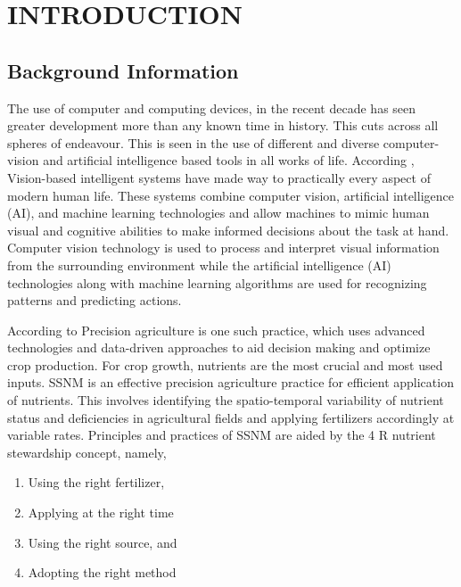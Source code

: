 \chapter{INTRODUCTION}
\section{Background Information}
The use of computer and computing devices, in the recent decade has seen greater development more than any known time in history. This cuts across all spheres of endeavour. This is seen in the use of different and diverse computer-vision and artificial intelligence based tools in all works of life. According
\citep{ghazalComputerVisionSmart2024}, Vision-based intelligent systems have made way to practically every aspect of modern human life. These systems combine computer vision, artificial intelligence (AI), and machine learning technologies and allow machines to mimic human visual and cognitive abilities to make informed decisions about the task at hand. Computer vision technology is used to process and interpret visual information from the surrounding environment while the artificial intelligence (AI) technologies along with machine learning algorithms are used for recognizing patterns and predicting actions.

According to \citep{VULLAGANTI2025147} Precision agriculture is one such practice, which uses advanced technologies and data-driven approaches to aid decision making and optimize crop production. For crop growth, nutrients are the most crucial and most used inputs. SSNM is an effective precision agriculture practice for efficient application of nutrients. This involves identifying the spatio-temporal variability of nutrient status and deficiencies in agricultural fields and applying fertilizers accordingly at variable rates. Principles and practices of SSNM are aided by the 4 R nutrient stewardship concept, namely, 
\begin{enumerate}
	\item Using the right fertilizer,
	\item Applying at the right time
	\item Using the right source, and 
	\item Adopting the right method
\end{enumerate}

